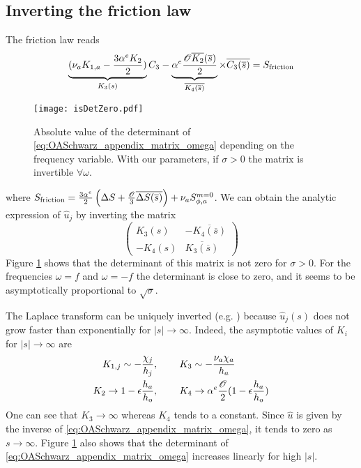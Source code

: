 \subsection{Inverting the friction law}
The friction law reads
\begin{equation}
	\underbrace{(\nu_a K_{1,a} - \frac{3\alpha^e K_{2}}{2})}_{
		K_3(s)
	}{C}_3
	-\underbrace{
		\alpha^e \frac{{\cal O} \overline{K_2}(\overline{s})}{2}}_{
		\overline{K_4(\overline{s})}}
	\times \overline{{C}_3(\overline{s})}
	= S_{\rm friction}
\end{equation}
\begin{figure}
    \centering
    \texttt{[image: isDetZero.pdf]}
    \caption{Absolute value of the determinant of
	\eqref{eq:OASchwarz_appendix_matrix_omega} depending on
	the frequency variable. With our parameters,
	if $\sigma>0$ the matrix is invertible $\forall \omega$.}
    \label{fig:OASchwarz_isDetZero}
\end{figure}
where $S_{\rm friction} =
	\frac{3\alpha^e}{2} \left(
	\Delta S + \frac{\cal O}{3}
	\overline{\Delta S(\overline{s})}\right)
	+\nu_a S_{\phi,a}^{m=0}$.
We can obtain the analytic expression of $\widehat{u}_j$
by inverting the matrix
\begin{equation}
	\label{eq:OASchwarz_appendix_matrix_omega}
	\begin{pmatrix}
		K_3(s)& - \overline{K_4(\overline{s})}\\
		-K_4(s) & \overline{K_3(\overline{s})}
	\end{pmatrix}
\end{equation}
Figure \ref{fig:OASchwarz_isDetZero} shows that the determinant of
this matrix is not zero for $\sigma>0$. For the frequencies
$\omega=f$ and $\omega=-f$ the determinant is close to zero, and
it seems to be asymptotically proportional to $\sqrt{\sigma}$.
\par
The Laplace transform can be uniquely inverted
(e.g. \citep{cohen_inversion_2007}) because
$\widehat{u}_j(s)$ does not grow faster than exponentially
for $|s|\rightarrow \infty$.
Indeed, the asymptotic values of $K_i$ for $|s|\to\infty$ are
\begin{equation*}
	\begin{aligned}
		K_{1,j} \sim -\frac{\chi_j}{h_j}, ~~~~~~~&
		K_{3} \sim -\frac{\nu_a \chi_a}{h_a}\\
		K_{2} \rightarrow 1 - \epsilon \frac{h_a}{h_o},
		~~~~~~~&
		K_{4} \rightarrow \alpha^e
		\frac{\cal O}{2}(1 - \epsilon \frac{h_a}{h_o})
	\end{aligned}
\end{equation*}
One can see that $K_3 \rightarrow \infty$ whereas $K_4$ tends to
a constant. Since $\widehat{u}$ is given by the inverse of
\eqref{eq:OASchwarz_appendix_matrix_omega}, it tends to zero as
$s\rightarrow \infty$.
Figure \ref{fig:OASchwarz_isDetZero} also
shows that the determinant of
\eqref{eq:OASchwarz_appendix_matrix_omega} increases linearly for
high $|s|$.
